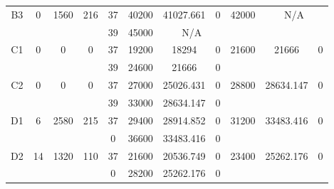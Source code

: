 \begin{sidewaystable}
\begin{tabular}{c||c|c|c||c|c|c|c||c|c|c}
         &
        
      \\
      \hline
      \multirow{2}{*}{B3} &
      \multirow{2}{*}{0} &
      \multirow{2}{*}{1560} &
      \multirow{2}{*}{216} &
      37 &
      40200 &
        41027.661 &
        0 &
      \multirow{2}{*}{42000} &
        \multicolumn{2}{c}{\multirow{2}{*}{N/A}}
      \\
      \cline{5-8}
       &
       &
       &
       &
      39 &
      45000 &
        \multicolumn{2}{|c||}{N/A} &
      
        
      \\
      \hline
      \multirow{2}{*}{C1} &
      \multirow{2}{*}{0} &
      \multirow{2}{*}{0} &
      \multirow{2}{*}{0} &
      37 &
      19200 &
        18294 &
        0 &
      \multirow{2}{*}{21600} &
        \multirow{2}{*}{21666} &
        \multirow{2}{*}{0}
      \\
      \cline{5-8}
       &
       &
       &
       &
      39 &
      24600 &
        21666 &
        0 &
      
         &
        
      \\
      \hline
      \multirow{2}{*}{C2} &
      \multirow{2}{*}{0} &
      \multirow{2}{*}{0} &
      \multirow{2}{*}{0} &
      37 &
      27000 &
        25026.431 &
        0 &
      \multirow{2}{*}{28800} &
        \multirow{2}{*}{28634.147} &
        \multirow{2}{*}{0}
      \\
      \cline{5-8}
       &
       &
       &
       &
      39 &
      33000 &
        28634.147 &
        0 &
      
         &
        
      \\
      \hline
      \multirow{2}{*}{D1} &
      \multirow{2}{*}{6} &
      \multirow{2}{*}{2580} &
      \multirow{2}{*}{215} &
      37 &
      29400 &
        28914.852 &
        0 &
      \multirow{2}{*}{31200} &
        \multirow{2}{*}{33483.416} &
        \multirow{2}{*}{0}
      \\
      \cline{5-8}
       &
       &
       &
       &
      0 &
      36600 &
        33483.416 &
        0 &
      
         &
        
      \\
      \hline
      \multirow{2}{*}{D2} &
      \multirow{2}{*}{14} &
      \multirow{2}{*}{1320} &
      \multirow{2}{*}{110} &
      37 &
      21600 &
        20536.749 &
        0 &
      \multirow{2}{*}{23400} &
        \multirow{2}{*}{25262.176} &
        \multirow{2}{*}{0}
      \\
      \cline{5-8}
       &
       &
       &
       &
      0 &
      28200 &
        25262.176 &
        0 &
      

\end{tabular}
\end{sidewaystable}
